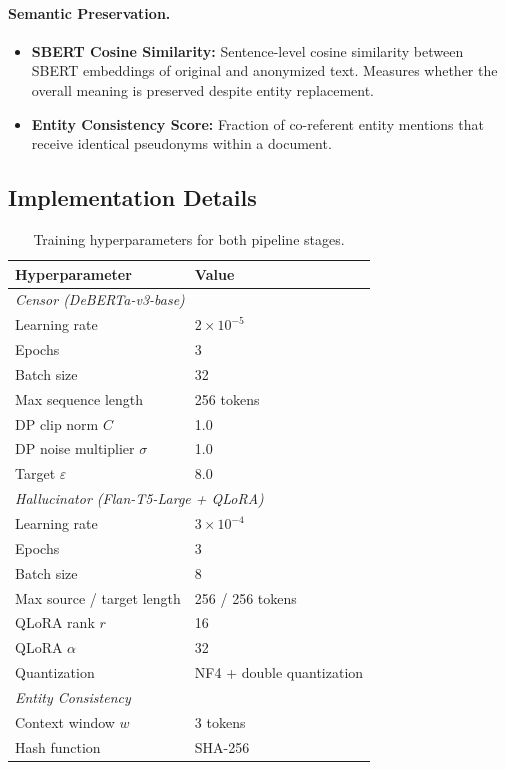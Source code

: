 \documentclass[11pt, a4paper]{article}
\begin{document}
\paragraph{Semantic Preservation.}
\begin{itemize}[leftmargin=*]
  \item \textbf{SBERT Cosine Similarity:} Sentence-level cosine
        similarity between SBERT embeddings of original and anonymized
        text.  Measures whether the overall meaning is preserved
        despite entity replacement.
  \item \textbf{Entity Consistency Score:} Fraction of co-referent
        entity mentions that receive identical pseudonyms within a
        document.
\end{itemize}

\subsection{Implementation Details}

\begin{table}[H]
\centering
\small
\begin{tabular}{ll}
\toprule
\textbf{Hyperparameter} & \textbf{Value} \\
\midrule
\multicolumn{2}{l}{\textit{Censor (DeBERTa-v3-base)}} \\
\quad Learning rate & $2 \times 10^{-5}$ \\
\quad Epochs & 3 \\
\quad Batch size & 32 \\
\quad Max sequence length & 256 tokens \\
\quad DP clip norm $C$ & 1.0 \\
\quad DP noise multiplier $\sigma$ & 1.0 \\
\quad Target $\varepsilon$ & 8.0 \\
\midrule
\multicolumn{2}{l}{\textit{Hallucinator (Flan-T5-Large + QLoRA)}} \\
\quad Learning rate & $3 \times 10^{-4}$ \\
\quad Epochs & 3 \\
\quad Batch size & 8 \\
\quad Max source / target length & 256 / 256 tokens \\
\quad QLoRA rank $r$ & 16 \\
\quad QLoRA $\alpha$ & 32 \\
\quad Quantization & NF4 + double quantization \\
\midrule
\multicolumn{2}{l}{\textit{Entity Consistency}} \\
\quad Context window $w$ & 3 tokens \\
\quad Hash function & SHA-256 \\
\bottomrule
\end{tabular}
\caption{Training hyperparameters for both pipeline stages.}
\label{tab:hyperparams}
\end{table}
\end{document}
